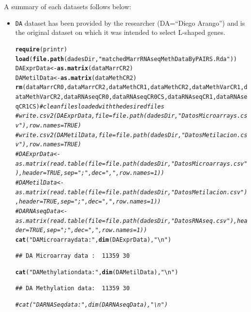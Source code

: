 \documentclass[a4paper,10pt]{article}\usepackage[]{graphicx}\usepackage[]{color}
\makeatletter
\newcommand{\hlstr}[1]{\textcolor[rgb]{0.192,0.494,0.8}{#1}}%
\newcommand{\hlcom}[1]{\textcolor[rgb]{0.678,0.584,0.686}{\textit{#1}}}%
\newcommand{\hlstd}[1]{\textcolor[rgb]{0.345,0.345,0.345}{#1}}%
\newcommand{\hlkwb}[1]{\textcolor[rgb]{0.69,0.353,0.396}{#1}}%
\newcommand{\hlkwd}[1]{\textcolor[rgb]{0.737,0.353,0.396}{\textbf{#1}}}%
\newenvironment{kframe}{%
 \def\at@end@of@kframe{}%
 \ifinner\ifhmode%
  \def\at@end@of@kframe{\end{minipage}}%
  \begin{minipage}{\columnwidth}%
 \fi\fi%
 \def\FrameCommand##1{\hskip\@totalleftmargin \hskip-\fboxsep
 \colorbox{shadecolor}{##1}\hskip-\fboxsep
     \hskip-\linewidth \hskip-\@totalleftmargin \hskip\columnwidth}%
 \MakeFramed {\advance\hsize-\width
   \@totalleftmargin\z@ \linewidth\hsize
   \@setminipage}}%
 {\par\unskip\endMakeFramed%
 \at@end@of@kframe}
\newenvironment{knitrout}{}{} %
\makeatother
\begin{document}
A summary of each datasets follows below:
\begin{itemize}
\item \texttt{DA} dataset has been provided by the researcher (DA=``Diego Arango'') and is the original dataset on which it was intended to select L-shaped  genes.

\begin{knitrout}
\color{fgcolor}\begin{kframe}
\begin{alltt}
\hlkwd{require}\hlstd{(printr)}
\hlkwd{load}\hlstd{(}\hlkwd{file.path}\hlstd{(dadesDir,}\hlstr{"matchedMarrRNAseqMethDataByPAIRS.Rda"}\hlstd{))}
\hlstd{DAExprData} \hlkwb{<-} \hlkwd{as.matrix}\hlstd{(dataMarrCR2)}
\hlstd{DAMetilData} \hlkwb{<-} \hlkwd{as.matrix}\hlstd{(dataMethCR2)}
\hlkwd{rm}\hlstd{(dataMarrCR0,dataMarrCR2, dataMethCR1, dataMethCR2, dataMethVarCR1, dataMethVarCR2, dataRNAseqCR0, dataRNAseqCR0CS, dataRNAseqCR1, dataRNAseqCR1CS)} \hlcom{# clean files loaded with the desired files}
\hlcom{#write.csv2(DAExprData, file=file.path(dadesDir,"DatosMicroarrays.csv"),row.names = TRUE)}
\hlcom{# write.csv2(DAMetilData, file=file.path(dadesDir,"DatosMetilacion.csv"),row.names = TRUE)}
\hlcom{# DAExprData <- as.matrix(read.table(file=file.path(dadesDir,"DatosMicroarrays.csv"), header=TRUE, sep=";", dec=",", row.names = 1))}
\hlcom{# DAMetilData <- as.matrix(read.table(file=file.path(dadesDir,"DatosMetilacion.csv"), header=TRUE, sep=";",dec=",", row.names = 1))}
\hlcom{# DARNAseqData <- as.matrix(read.table(file=file.path(dadesDir,"DatosRNAseq.csv"), header=TRUE, sep=";",dec=",", row.names = 1))}
\hlkwd{cat}\hlstd{(}\hlstr{"DA Microarray data : "}\hlstd{,} \hlkwd{dim}\hlstd{(DAExprData),} \hlstr{"\textbackslash{}n"}\hlstd{)}
\end{alltt}
\begin{verbatim}
## DA Microarray data :  11359 30
\end{verbatim}
\begin{alltt}
\hlkwd{cat}\hlstd{(}\hlstr{"DA Methylation data: "}\hlstd{,} \hlkwd{dim}\hlstd{(DAMetilData),} \hlstr{"\textbackslash{}n"}\hlstd{)}
\end{alltt}
\begin{verbatim}
## DA Methylation data:  11359 30
\end{verbatim}
\begin{alltt}
\hlcom{# cat("DA RNASeq data     : ", dim(DARNAseqData), "\textbackslash{}n")}
\end{alltt}
\end{kframe}
\end{knitrout}


\end{itemize}
\end{document}
